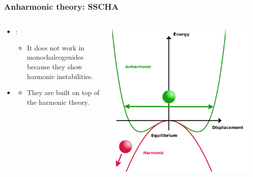 \documentclass{beamer}
\begin{document}
\begin{frame}

 \frametitle{Anharmonic theory: SSCHA}
\begin{columns}
\begin{column}{0.45\textwidth}
 \begin{itemize}
  \item \color{red}{Harmonic approximation}:
  \begin{itemize}
   \item It does not work in monochalcogenides because they show harmonic instabilities.
  \end{itemize}
 \end{itemize}
 \begin{itemize}
  \item \color{red}{Perturbative approaches are not an option.}
  \begin{itemize}
   \item They are built on top of the harmonic theory.
  \end{itemize}
 \end{itemize}
\end{column}
\begin{column}{0.45\textwidth}
 \begin{center}
  \includegraphics[width=0.9\linewidth]{Pictures/THEORY/instability.png}
 \end{center}
\end{column}

\end{columns}
\end{frame}
\end{document}
